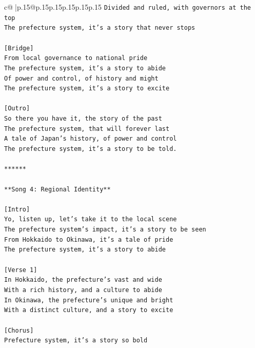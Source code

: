 \documentclass{article}
\begin{document}
{\begin{supertabular}{c@{$\;$}|p{.15\linewidth}@{}p{.15\linewidth}p{.15\linewidth}p{.15\linewidth}p{.15\linewidth}p{.15\linewidth}}
{{{\texttt{Divided and ruled, with governors at the top} \\
\texttt{The prefecture system, it's a story that never stops} \\
\\ 
\texttt{{[}Bridge{]}} \\
\texttt{From local governance to national pride} \\
\texttt{The prefecture system, it's a story to abide} \\
\texttt{Of power and control, of history and might} \\
\texttt{The prefecture system, it's a story to excite} \\
\\ 
\texttt{{[}Outro{]}} \\
\texttt{So there you have it, the story of the past} \\
\texttt{The prefecture system, that will forever last} \\
\texttt{A tale of Japan's history, of power and control} \\
\texttt{The prefecture system, it's a story to be told.} \\
\\ 
\texttt{******} \\
\\ 
\texttt{**Song 4: Regional Identity**} \\
\\ 
\texttt{{[}Intro{]}} \\
\texttt{Yo, listen up, let's take it to the local scene} \\
\texttt{The prefecture system's impact, it's a story to be seen} \\
\texttt{From Hokkaido to Okinawa, it's a tale of pride} \\
\texttt{The prefecture system, it's a story to abide} \\
\\ 
\texttt{{[}Verse 1{]}} \\
\texttt{In Hokkaido, the prefecture's vast and wide} \\
\texttt{With a rich history, and a culture to abide} \\
\texttt{In Okinawa, the prefecture's unique and bright} \\
\texttt{With a distinct culture, and a story to excite} \\
\\ 
\texttt{{[}Chorus{]}} \\
\texttt{Prefecture system, it's a story so bold} \\
}}}
\end{supertabular}}
\end{document}
